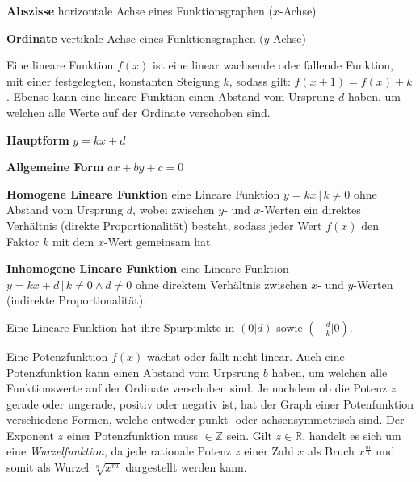 \textbf{Abszisse}  horizontale Achse eines Funktionsgraphen ($x$-Achse)

\textbf{Ordinate}  vertikale Achse eines Funktionsgraphen ($y$-Achse)


Eine lineare Funktion $f(x)$ ist eine linear wachsende oder fallende Funktion, mit einer festgelegten, konstanten Steigung $k$, sodass gilt: $f(x + 1) = f(x) + k$. Ebenso kann eine lineare Funktion einen Abstand vom Ursprung $d$ haben, um welchen alle Werte auf der Ordinate verschoben sind.

\textbf{Hauptform}  $y = kx + d$

\textbf{Allgemeine Form}  $ax + by + c = 0$

\textbf{Homogene Lineare Funktion}  eine Lineare Funktion $y = kx\,|\,k \neq 0$ ohne Abstand vom Ursprung $d$, wobei zwischen $y$- und $x$-Werten ein direktes Verh\"{a}ltnis (direkte Proportionalit\"{a}t) besteht, sodass jeder Wert $f(x)$ den Faktor $k$ mit dem $x$-Wert gemeinsam hat.

\textbf{Inhomogene Lineare Funktion}  eine Lineare Funktion $y = kx + d \,|\, k \neq 0 \land d \neq 0$ ohne direktem Verh\"{a}ltnis zwischen $x$- und $y$-Werten (indirekte Proportionalit\"{a}t).

Eine Lineare Funktion hat ihre Spurpunkte in $(0|d)$ sowie $(-\frac{d}{k}|0)$.

\begin{figure}[h!]
\centering
\end{figure}


\pagebreak


Eine Potenzfunktion $f(x)$ w\"{a}chst oder f\"{a}llt nicht-linear. Auch eine Potenzfunktion kann einen Abstand vom Urpsrung $b$ haben, um welchen alle Funktionswerte auf der Ordinate verschoben sind. Je nachdem ob die Potenz $z$ gerade oder ungerade, positiv oder negativ ist, hat der Graph einer Potenfunktion verschiedene Formen, welche entweder punkt- oder achsensymmetrisch sind. Der Exponent $z$ einer Potenzfunktion muss $\in \mathbb{Z}$ sein. Gilt $z \in \mathbb{R}$, handelt es sich um eine \emph{Wurzelfunktion}, da jede rationale Potenz $z$ einer Zahl $x$ als Bruch $x^{\frac{m}{n}}$ und somit als Wurzel $\sqrt[n]{x^m}$ dargestellt werden kann.

